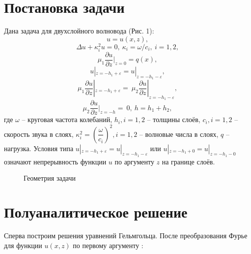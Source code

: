 \documentclass[a4paper, 12pt]{article}
\begin{document}
\section{Постановка задачи}
Дана задача для двухслойного волновода (Рис. 1):
$$u=u(x,z),$$
$$\Delta u + \kappa_i^2 u=0,\ \kappa_i=\omega/c_i,\ i=1,2,$$
$$\mu_1 \frac{\partial u}{\partial z}|_{z=0}=q(x),$$
$$ u|_{z=-h_1+\varepsilon}=u|_{z=-h_1-\varepsilon},$$
$$\mu_1 \frac{\partial u}{\partial z}|_{z=-h_1+\varepsilon}=\ \mu_2 \frac{\partial u}{\partial z}|_{z=-h_1-\varepsilon},$$
$$\mu_2 \frac{\partial u}{\partial z}|_{z=-h}=\ 0,\ h=h_1+h_2,$$
где $\omega$ -- круговая частота колебаний, $h_i, i=1, 2$ -- толщины слоёв, $c_i, i=1, 2$ -- скорость звука в слоях, $\kappa_i^2=\left(\dfrac{\omega}{c_i} \right)^2, i=1, 2$ -- волновые числа в слоях, $q$ -- нагрузка. Условия типа $ u|_{z=-h_1+\varepsilon}=u|_{z=-h_1-\varepsilon}$ или $ u|_{z=-h_1+0}=u|_{z=-h_1-0}$ означают непрерывность функции $u$ по аргументу $z$ на границе слоёв.
\begin{figure}[h!]
\noindent{}
\caption{Геометрия задачи}
\label{figCurves}
\end{figure} 

\section{Полуаналитическое решение}
Сперва построим решения уравнений Гельмгольца. После преобразования Фурье для функции $u(x,z)$ по первому аргументу \cite{g90}:
\end{document}
